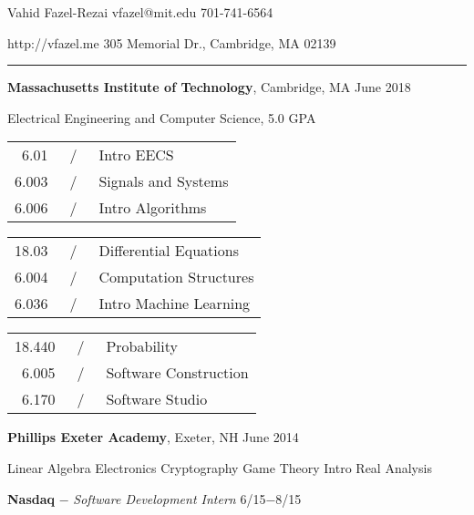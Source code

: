 \documentclass[11pt]{article}
\newcommand{\msection}[1]{\vspace{1em}\marginnote{#1}} %
\newcommand{\bt}[1]{\textbf{#1}} %
\newcommand{\gap}[0]{\vspace{0.5em}} %
\newcommand{\dash}[0]{ $-$ } %
\newcommand{\tabsep}[0]{\, / \,} %
\begin{document}

{\huge Vahid Fazel-Rezai} \hfill vfazel@mit.edu \hspace{4.5em} 701-741-6564

\vspace{0.5em}

http://vfazel.me \hfill 305 Memorial Dr., Cambridge, MA 02139

\vspace{0.2em}

\hspace{-1.2in}\rule{7.9in}{0.2em}

\vspace{-0.4em}



\msection{Education}

\bt{Massachusetts Institute of Technology}, Cambridge, MA \hfill June 2018

Electrical Engineering and Computer Science, 5.0 GPA
\vspace{0.15em}

\begin{tabular}{rcl}
6.01 & \tabsep & Intro EECS \\
6.003 & \tabsep & Signals and Systems \\
6.006 & \tabsep & Intro Algorithms
\end{tabular}
\hfill
\begin{tabular}{rcl}
18.03 & \tabsep & Differential Equations \\
6.004 & \tabsep & Computation Structures \\
6.036 & \tabsep & Intro Machine Learning
\end{tabular}
\hfill
\begin{tabular}{rcl}
18.440 & \tabsep & Probability \\
6.005 & \tabsep & Software Construction \\
6.170 & \tabsep & Software Studio
\end{tabular}

\gap

\bt{Phillips Exeter Academy}, Exeter, NH \hfill June 2014

Linear Algebra
\hfill
Electronics
\hfill
Cryptography
\hfill
Game Theory
\hfill
Intro Real Analysis



\msection{Work}

\bt{Nasdaq}\dash \emph{Software Development Intern} \hfill 6/15$-$8/15
\end{document}
